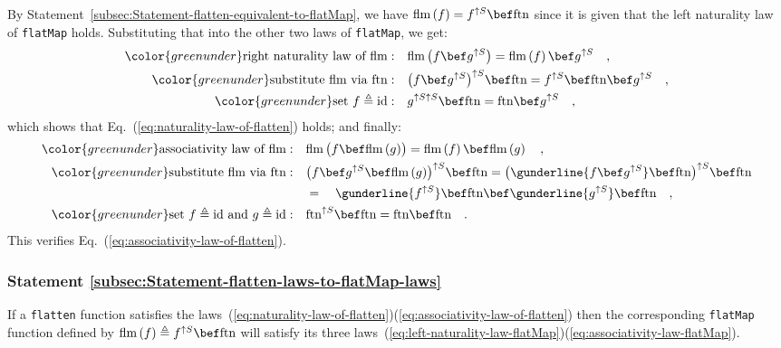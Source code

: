 By Statement~\ref{subsec:Statement-flatten-equivalent-to-flatMap},
we have $\text{flm}\left(f\right)=f^{\uparrow S}\bef\text{ftn}$ since
it is given that the left naturality law of \lstinline!flatMap! holds.
Substituting that into the other two laws of \lstinline!flatMap!,
we get:
\begin{align*}
{\color{greenunder}\text{right naturality law of }\text{flm}:}\quad & \text{flm}\,\big(f\bef g^{\uparrow S}\big)=\text{flm}\left(f\right)\bef g^{\uparrow S}\quad,\\
{\color{greenunder}\text{substitute \ensuremath{\text{flm}} via }\text{ftn}:}\quad & \big(f\bef g^{\uparrow S}\big)^{\uparrow S}\bef\text{ftn}=f^{\uparrow S}\bef\text{ftn}\bef g^{\uparrow S}\quad,\\
{\color{greenunder}\text{set }f\triangleq\text{id}:}\quad & g^{\uparrow S\uparrow S}\bef\text{ftn}=\text{ftn}\bef g^{\uparrow S}\quad,
\end{align*}
which shows that Eq.~(\ref{eq:naturality-law-of-flatten}) holds;
and finally:
\begin{align*}
{\color{greenunder}\text{associativity law of }\text{flm}:}\quad & \text{flm}\,\big(f\bef\text{flm}\,(g)\big)=\text{flm}\left(f\right)\bef\text{flm}\left(g\right)\quad,\\
{\color{greenunder}\text{substitute \ensuremath{\text{flm}} via }\text{ftn}:}\quad & \big(f\bef g^{\uparrow S}\bef\text{flm}\,(g)\big)^{\uparrow S}\bef\text{ftn}=\big(\gunderline{f\bef g^{\uparrow S}}\bef\text{ftn}\big)^{\uparrow S}\bef\text{ftn}\\
 & =\quad\gunderline{f^{\uparrow S}}\bef\text{ftn}\bef\gunderline{g^{\uparrow S}}\bef\text{ftn}\quad,\\
{\color{greenunder}\text{set }f\triangleq\text{id}\text{ and }g\triangleq\text{id}:}\quad & \text{ftn}^{\uparrow S}\bef\text{ftn}=\text{ftn}\bef\text{ftn}\quad.
\end{align*}
This verifies Eq.~(\ref{eq:associativity-law-of-flatten}).

\subsubsection{Statement \label{subsec:Statement-flatten-laws-to-flatMap-laws}\ref{subsec:Statement-flatten-laws-to-flatMap-laws}}

If a \lstinline!flatten! function satisfies the laws~(\ref{eq:naturality-law-of-flatten})\textendash (\ref{eq:associativity-law-of-flatten})
then the corresponding \lstinline!flatMap! function defined by $\text{flm}\left(f\right)\triangleq f^{\uparrow S}\bef\text{ftn}$
will satisfy its three laws~(\ref{eq:left-naturality-law-flatMap})\textendash (\ref{eq:associativity-law-flatMap}).

